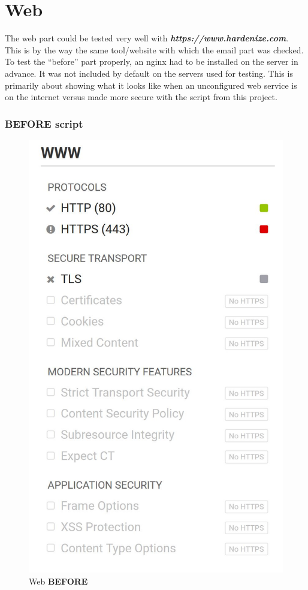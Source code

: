 \section{Web}
The web part could be tested very well with \textbf{\textit{https://www.hardenize.com}}. This is by the way the same tool/website with which the email part was checked.
\newline To test the ``before'' part properly, an nginx had to be installed on the server in advance. It was not included by default on the servers used for testing. 
This is primarily about showing what it looks like when an unconfigured web service is on the internet versus made more secure with the script from this project.

\subsubsection{BEFORE script}
\begin{figure}[H]
	\centering
	\includegraphics[width=0.66\linewidth]{pics/hardenize_web_before}
	\caption{Web \textbf{BEFORE}}
	\label{fig:beforeWeb}
\end{figure}


